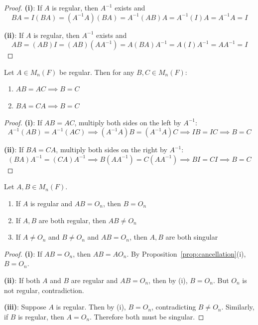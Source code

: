 \begin{proof}
    \textbf{(i)}: If $A$ is regular, then $A^{-1}$ exists and
    \[
    BA = I(BA) = (A^{-1}A)(BA) = A^{-1}(AB)A = A^{-1}(I)A = A^{-1}A = I
    \]
    
    \textbf{(ii)}: If $A$ is regular, then $A^{-1}$ exists and
    \[
    AB = (AB)I = (AB)(AA^{-1}) = A(BA)A^{-1} = A(I)A^{-1} = AA^{-1} = I
    \]
\end{proof}

\begin{proposition}\label{prop:cancellation}
    Let $A \in M_n(F)$ be regular. Then for any $B, C \in M_n(F)$:
    \begin{enumerate}[label=(\roman*)]
        \item $AB = AC \implies B = C$
        \item $BA = CA \implies B = C$
    \end{enumerate}
\end{proposition}

\begin{proof}
    \textbf{(i)}: If $AB = AC$, multiply both sides on the left by $A^{-1}$:
    \[
    A^{-1}(AB) = A^{-1}(AC) \implies (A^{-1}A)B = (A^{-1}A)C \implies IB = IC \implies B = C
    \]
    
    \textbf{(ii)}: If $BA = CA$, multiply both sides on the right by $A^{-1}$:
    \[
    (BA)A^{-1} = (CA)A^{-1} \implies B(AA^{-1}) = C(AA^{-1}) \implies BI = CI \implies B = C
    \]
\end{proof}

\begin{proposition}\label{prop:zero-product}
    Let $A, B \in M_n(F)$.
    \begin{enumerate}[label=(\roman*)]
        \item If $A$ is regular and $AB = O_n$, then $B = O_n$
        \item If $A, B$ are both regular, then $AB \neq O_n$
        \item If $A \neq O_n$ and $B \neq O_n$ and $AB = O_n$, then $A, B$ are both singular
    \end{enumerate}
\end{proposition}

\begin{proof}
    \textbf{(i)}: If $AB = O_n$, then $AB = AO_n$. By Proposition~\ref{prop:cancellation}(i), $B = O_n$.
    
    \textbf{(ii)}: If both $A$ and $B$ are regular and $AB = O_n$, then by (i), $B = O_n$. But $O_n$ is not regular, contradiction.
    
    \textbf{(iii)}: Suppose $A$ is regular. Then by (i), $B = O_n$, contradicting $B \neq O_n$. Similarly, if $B$ is regular, then $A = O_n$. Therefore both must be singular.
\end{proof}

